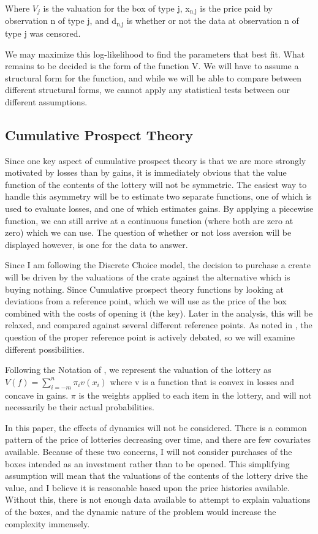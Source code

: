 \documentclass[12pt, letterpaper]{paper}
\begin{document}
Where $V_j$ is the valuation for the box of type j, x$_{\text{n,j}}$ is the price
paid by observation n of type j, and d$_{\text{n,j}}$ is whether or not the data
at observation n of type j was censored.

We may maximize this log-likelihood to find the parameters that best
fit. What remains to be decided is the form of the function V. We will
have to assume a structural form for the function, and while we will
be able to compare between different structural forms, we cannot apply
any statistical tests between our different assumptions. 

\subsection{Cumulative Prospect Theory}
\label{sec-2-3}
Since one key aspect of cumulative prospect theory is that we are more
strongly motivated by losses than by gains, it is immediately obvious
that the value function of the contents of the lottery will not be
symmetric. The easiest way to handle this asymmetry will be to
estimate two separate functions, one of which is used to evaluate
losses, and one of which estimates gains. By applying a piecewise
function, we can still arrive at a continuous function (where both are
zero at zero) which we can use. The question of whether or not loss
aversion will be displayed however, is one for the data to answer.

Since I am following the Discrete Choice model, the decision to
purchase a create will be driven by the valuations of the crate
against the alternative which is buying nothing. Since Cumulative
prospect theory functions by looking at deviations from a reference
point, which we will use as the price of the box combined with the
costs of opening it (the key). Later in the analysis, this will be
relaxed, and compared against several different reference points. As
noted in \cite{LitReview}, the question of the proper reference point is
actively debated, so we will examine different possibilities.

Following the Notation of \cite{Kahn}, we represent the valuation of the
lottery as $V(f) = \sum_{i=-m}^n \pi_i v(x_i)$ where v is a function
that is convex in losses and concave in gains. $\pi$ is the weights
applied to each item in the lottery, and will not necessarily be their
actual probabilities.

In this paper, the effects of dynamics will not be considered. There
is a common pattern of the price of lotteries decreasing over time,
and there are few covariates available. Because of these two concerns,
I will not consider purchases of the boxes intended as an investment
rather than to be opened. This simplifying assumption will mean that
the valuations of the contents of the lottery drive the value, and I
believe it is reasonable based upon the price histories
available. Without this, there is not enough data available to attempt
to explain valuations of the boxes, and the dynamic nature of the
problem would increase the complexity immensely.
\end{document}
